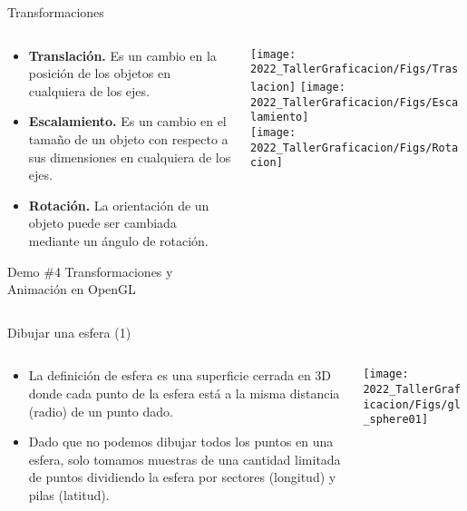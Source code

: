 \begin{frame}{Transformaciones}
\begin{columns}
\begin{column}{0.5\textwidth}
\begin{itemize}
\item \textbf{Translación.} Es un cambio en la posición de los objetos en cualquiera de los ejes.
\item \textbf{Escalamiento.} Es un cambio en el tamaño de un objeto con respecto a sus dimensiones en cualquiera de los ejes. 
\item \textbf{Rotación.} La orientación de un objeto puede ser cambiada mediante un ángulo de rotación.

\end{itemize}
\begin{block}{Demo \#4}
Transformaciones y Animación en OpenGL
\end{block}
\end{column}
\begin{column}{0.5\textwidth}
\begin{center}
 \texttt{[image: 2022\_TallerGraficacion/Figs/Traslacion]}
     \texttt{[image: 2022\_TallerGraficacion/Figs/Escalamiento]}\\
  \texttt{[image: 2022\_TallerGraficacion/Figs/Rotacion]}

 \end{center}
\end{column}
\end{columns}

\end{frame}



\begin{frame}{Dibujar una esfera (1)}
\begin{columns}
\begin{column}{0.5\textwidth}
\begin{itemize}
\item La definición de esfera es una superficie cerrada en 3D donde cada punto de la esfera está a la misma distancia (radio) de un punto dado.
\item Dado que no podemos dibujar todos los puntos en una esfera, solo tomamos muestras de una cantidad limitada de puntos dividiendo la esfera por sectores (longitud) y pilas (latitud).
\end{itemize}

\end{column}
\begin{column}{0.5\textwidth}
\begin{center}
 \texttt{[image: 2022\_TallerGraficacion/Figs/gl\_sphere01]}
 \end{center}
\end{column}
\end{columns}


\end{frame}

